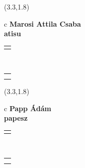 \documentclass[11pt]{article}
\begin{document}
\makebox(3.3,1.8){
  \renewcommand\arraystretch{1.3}
  \begin{tabular}[c]{c}
    \hspace{8.5mm}
    \LARGE\bf{ Marosi Attila Csaba }\\
    \hspace{8.5mm}
    \Large{ atisu }\\
    \renewcommand\arraystretch{3}
    \begin{tabular}[c]{c}
      \centering
      \fontfamily{phv}\selectfont{
        \textbf{
          \textsc{
            \scriptsize{
            \color{Bright}{ Ismerkedő }\color{Bright}{ Webmester }\color{Bright}{ Sminkmester }\color{Dark}{ Programozó }
            }
          }
        }
      }
    \end{tabular}
    \\
    \renewcommand\arraystretch{1}
    \begin{tabular}{p{3.3in}}
      \hspace{.7cm}\\
      \hspace{.7cm}\emph{  }\\
    \end{tabular}
  \end{tabular}
}

\makebox(3.3,1.8){
  \renewcommand\arraystretch{1.3}
  \begin{tabular}[c]{c}
    \hspace{8.5mm}
    \LARGE\bf{ Papp Ádám }\\
    \hspace{8.5mm}
    \Large{ papesz }\\
    \renewcommand\arraystretch{3}
    \begin{tabular}[c]{c}
      \centering
      \fontfamily{phv}\selectfont{
        \textbf{
          \textsc{
            \scriptsize{
            \color{Dark}{ Ismerkedő }\color{Bright}{ Webmester }\color{Bright}{ Sminkmester }\color{Bright}{ Programozó }
            }
          }
        }
      }
    \end{tabular}
    \\
    \renewcommand\arraystretch{1}
    \begin{tabular}{p{3.3in}}
      \hspace{.7cm}\\
      \hspace{.7cm}\emph{  }\\
    \end{tabular}
  \end{tabular}
}
\end{document}
